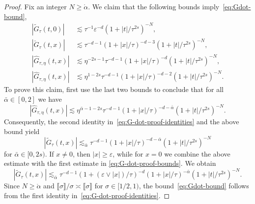 \documentclass{article}
\numberwithin{equation}{section}
\theoremstyle{plain}
\theoremstyle{definition}
\begin{document}
\begin{proof}
  Fix an integer $N\geqslant\mathring\alpha$. We claim that the following
  bounds imply~\eqref{eq:Gdot-bound},
  \begin{equation}
    \begin{aligned}
      | \tilde{G}_{\tau} (t, 0) | & \lesssim \tau^{- 1}
      \varepsilon^{- d} (1 + | t |  / \tau^{2 s})^{- N},\\
      | \check{G}_{\tau} (t, x) | & \lesssim \tau^{- d - 1}
      (1 + | x |  / \tau)^{- d - 3} (1 + | t |  / \tau^{2 s})^{- N},\\
      | \hat{G}_{\tau, \eta} (t, x) | & \lesssim \eta^{- 2 s - 1}
      \tau^{- d - 1}  (1 + | x |  / \tau)^{- d}  (1 + | t |  / \tau^{2
      s})^{- N},\\
      | \hat{G}_{\tau, \eta} (t, x) | & \lesssim \eta^{1 - 2 s}
      \tau^{- d - 1}  (1 + | x |  / \tau)^{- d - 2}  (1 + | t |  /
      \tau^{2 s})^{- N} .
    \end{aligned} \label{eq:G-dot-proof-bounds}
  \end{equation}
  To prove this claim, first use the last two bounds to conclude that for all
  $\bar\alpha \in [0, 2]$ we have
  \[ | \hat{G}_{\tau, \eta} (t, x) | \lesssim \eta^{\bar\alpha - 1 - 2
     s} \tau^{- d - 1}  (1 + | x |  / \tau)^{- d - \bar\alpha}  {(1 + | t
     |  / \tau^{2 s})^{- N}}  . \]
  Consequently, the second identity in~\eqref{eq:G-dot-proof-identities} and
  the above bound yield
  \[ | \tilde{G}_{\tau} (t, x) | \lesssim_{\bar\alpha} \tau^{- d - 1}
     (1 + | x | / \tau)^{- d - \bar\alpha}
     (1 + | t | / \tau^{2 s})^{- N} \]
  for $\bar\alpha \in [0, 2 s)$. If $x\neq0$, then $|x|\geqslant\varepsilon$,
  while for $x=0$ we combine the above estimate with the first estimate in
  \eqref{eq:G-dot-proof-bounds}. We obtain
  \[ | \tilde{G}_{\tau} (t, x) | \lesssim_{\bar\alpha} \tau^{- d - 1}
     (1 + (\varepsilon \vee |x|) / \tau)^{- d}
     (1 + |x| / \tau)^{- \bar\alpha}
     (1 + |t| / \tau^{2 s})^{- N} . \]
  Since $N\geqslant\mathring\alpha$ and
  $\llbracket\sigma\rrbracket/\sigma\asymp\llbracket\sigma\rrbracket$ for
  $\sigma\in[1/2,1)$, the bound~\eqref{eq:Gdot-bound} follows from the first
  identity in~\eqref{eq:G-dot-proof-identities}.
  

\end{proof}
\end{document}

